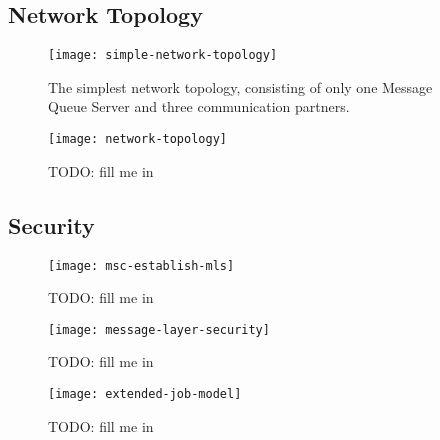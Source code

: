 \subsection{Network Topology}
\label{sec:network-topology}

\begin{figure}
  \begin{center}
    \texttt{[image: simple-network-topology]}
  \end{center}
  \caption[Network  Topology   (simple)]{The  simplest  network  topology,
    consisting of  only one Message  Queue Server and  three communication
    partners.}
  \label{fig:simple-net-top}
\end{figure}

\begin{figure}
  \begin{center}
    \texttt{[image: network-topology]}
  \end{center}
  \caption[Network  Topology]{TODO: fill me in}
  \label{fig:net-top}
\end{figure}

\subsection{Security}
\label{sec:security}

\begin{figure}
  \begin{center}
    \texttt{[image: msc-establish-mls]}
  \end{center}
  \caption[MSC Message Layer Security]{TODO: fill me in}
  \label{fig:msc-establish-mls}
\end{figure}


\begin{figure}
  \begin{center}
    \texttt{[image: message-layer-security]}
  \end{center}
  \caption[Message Layer Security]{TODO: fill me in}
  \label{fig:net-mls}
\end{figure}

\begin{figure}
  \begin{center}
    \texttt{[image: extended-job-model]}
  \end{center}
  \caption[Job Model (extended)]{TODO: fill me in}
  \label{fig:bes-extended-xen}
\end{figure}

